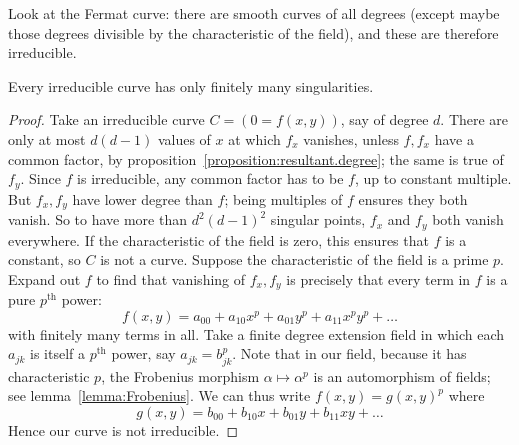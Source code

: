 \begin{example}
Look at the Fermat curve: there are smooth curves of all degrees (except maybe those degrees divisible by the characteristic of the field), and these are therefore irreducible.
\end{example}
\begin{theorem}
Every irreducible curve has only finitely many singularities.
\end{theorem}
\begin{proof}
Take an irreducible curve \(C=(0=f(x,y))\), say of degree \(d\).
There are only at most \(d(d-1)\) values of \(x\) at which \(f_x\) vanishes, unless \(f,f_x\) have a common factor, by proposition~\vref{proposition:resultant.degree}; the same is true of \(f_y\).
Since \(f\) is irreducible, any common factor has to be \(f\), up to constant multiple.
But \(f_x,f_y\) have lower degree than \(f\); being multiples of \(f\) ensures they both vanish.
So to have more than \(d^2(d-1)^2\) singular points, \(f_x\) and \(f_y\) both vanish everywhere.
If the characteristic of the field is zero, this ensures that \(f\) is a constant, so \(C\) is not a curve.
Suppose the characteristic of the field is a prime \(p\).
Expand out \(f\) to find that vanishing of \(f_x,f_y\) is precisely that every term in \(f\) is a pure \(p^{\text{th}}\) power:
\[
f(x,y)=a_{00}+a_{10}x^p+a_{01}y^p+a_{11}x^py^p+\dots
\]
with finitely many terms in all.
Take a finite degree extension field in which each \(a_{jk}\) is itself a \(p^{\text{th}}\) power, say \(a_{jk}=b^p_{jk}\).
Note that in our field, because it has characteristic \(p\), the Frobenius morphism \(\alpha\mapsto\alpha^p\) is an automorphism of fields; see lemma~\vref{lemma:Frobenius}.
We can thus write \(f(x,y)=g(x,y)^p\) where
\[
g(x,y)=b_{00}+b_{10}x+b_{01}y+b_{11}xy+\dots
\]
Hence our curve is not irreducible.
\end{proof}

